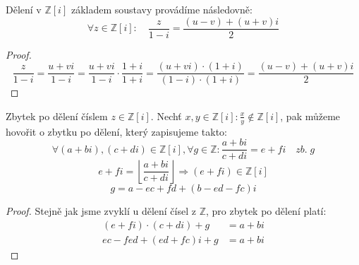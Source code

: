 \documentclass[czech,bachelor,dept470,male]{diploma}
\begin{document}
\begin{definition} Dělení v $\mathbb{Z}[i]$ základem soustavy provádíme následovně:
	$$\forall z \in \mathbb{Z}[i]:\quad \frac{z}{1-i}= \frac{(u-v)+(u+v)i}{2}$$
\end{definition}
\begin{proof}
	$$\frac{z}{1-i}=\frac{u+vi}{1-i}=\frac{u+vi}{1-i}\cdot\frac{1+i}{1+i} = \frac{(u+vi)\cdot(1+i)}{(1-i)\cdot(1+i)}=\frac{(u-v)+(u+v)i}{2}$$
	\end{proof}
\begin{definition}
Zbytek po dělení číslem $z\in\mathbb{Z}[i]$.\newline
Nechť $x,y\in\mathbb{Z}[i]:\frac{x}{y}\notin\mathbb{Z}[i]$, pak můžeme hovořit o zbytku po dělení, který zapisujeme takto:
$$\forall(a+bi),(c+di)\in\mathbb{Z}[i],\forall g \in\mathbb{Z}: \frac{a+bi}{c+di}=e+fi \quad zb.\;g$$
$$ e+fi = \left\lfloor\frac{a+bi}{c+di}\right\rfloor\Rightarrow(e+fi)\in\mathbb{Z}[i]$$
$$ g = a - ec + fd + (b -ed -fc)i$$
	\end{definition}
\begin{proof}
	Stejně jak jsme zvyklí u dělení čísel z $\mathbb{Z}$, pro zbytek po dělení platí:
	\begin{align} (e+fi)\cdot(c+di)+g&= a+bi\nonumber\\
	ec-fed+(ed+fc)i+g&=a+bi
	\end{align}
\end{proof}
\end{document}

